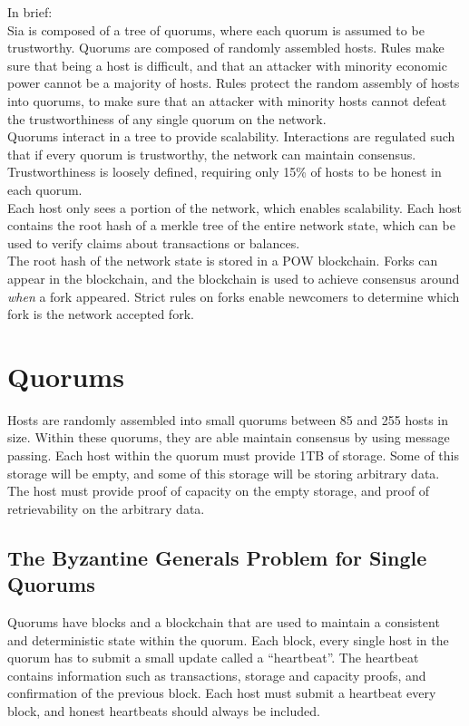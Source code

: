 \documentclass[twocolumn]{article}
\begin{document}
In brief: \\
Sia is composed of a tree of quorums, where each quorum is assumed to be trustworthy.
Quorums are composed of randomly assembled hosts.
Rules make sure that being a host is difficult, and that an attacker with minority economic power cannot be a majority of hosts.
Rules protect the random assembly of hosts into quorums, to make sure that an attacker with minority hosts cannot defeat the trustworthiness of any single quorum on the network. \\
Quorums interact in a tree to provide scalability.
Interactions are regulated such that if every quorum is trustworthy, the network can maintain consensus.
Trustworthiness is loosely defined, requiring only 15\% of hosts to be honest in each quorum. \\
Each host only sees a portion of the network, which enables scalability.
Each host contains the root hash of a merkle tree of the entire network state, which can be used to verify claims about transactions or balances. \\
The root hash of the network state is stored in a POW blockchain.
Forks can appear in the blockchain, and the blockchain is used to achieve consensus around \textit{when} a fork appeared.
Strict rules on forks enable newcomers to determine which fork is the network accepted fork.

\section{Quorums}
Hosts are randomly assembled into small quorums between 85 and 255 hosts in size.
Within these quorums, they are able maintain consensus by using message passing.
Each host within the quorum must provide 1TB of storage.
Some of this storage will be empty, and some of this storage will be storing arbitrary data.
The host must provide proof of capacity on the empty storage, and proof of retrievability on the arbitrary data.

\subsection{The Byzantine Generals Problem for Single Quorums}
Quorums have blocks and a blockchain that are used to maintain a consistent and deterministic state within the quorum.
Each block, every single host in the quorum has to submit a small update called a ``heartbeat''.
The heartbeat contains information such as transactions, storage and capacity proofs, and confirmation of the previous block.
Each host must submit a heartbeat every block, and honest heartbeats should always be included.
\end{document}
